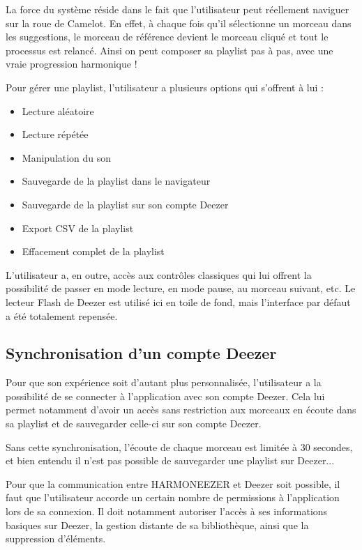 \documentclass[a4paper,12pt]{article}
\begin{document}
La force du système réside dans le fait que l'utilisateur peut réellement naviguer sur la roue de Camelot. En effet, à chaque fois qu'il sélectionne un morceau dans les suggestions, le morceau de référence devient le morceau cliqué et tout le processus est relancé. Ainsi on peut composer sa playlist pas à pas, avec une vraie progression harmonique !

Pour gérer une playlist, l'utilisateur a plusieurs options qui s'offrent à lui :

\begin{itemize}
 \item{Lecture aléatoire}
 \item{Lecture répétée}
 \item{Manipulation du son}
 \item{Sauvegarde de la playlist dans le navigateur}
 \item{Sauvegarde de la playlist sur son compte Deezer}
 \item{Export CSV de la playlist}
 \item{Effacement complet de la playlist}
\end{itemize}

L'utilisateur a, en outre, accès aux contrôles classiques qui lui offrent la possibilité de passer en mode lecture, en mode pause, au morceau suivant, etc. Le lecteur Flash de Deezer est utilisé ici en toile de fond, mais l'interface par défaut a été totalement repensée.

\subsection{Synchronisation d'un compte Deezer}

Pour que son expérience soit d'autant plus personnalisée, l'utilisateur a la possibilité de se connecter à l'application avec son compte Deezer. Cela lui permet notamment d'avoir un accès sans restriction aux morceaux en écoute dans sa playlist et de sauvegarder celle-ci sur son compte Deezer.

Sans cette synchronisation, l'écoute de chaque morceau est limitée à 30 secondes, et bien entendu il n'est pas possible de sauvegarder une playlist sur Deezer...

Pour que la communication entre HARMONEEZER et Deezer soit possible, il faut que l'utilisateur accorde un certain nombre de permissions à l'application lors de sa connexion. Il doit notamment autoriser l'accès à ses informations basiques sur Deezer, la gestion distante de sa bibliothèque, ainsi que la suppression d'éléments.
\end{document}
